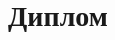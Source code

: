 \documentclass[14pt,a4paper,russian]{extreport}
\begin{document}
\title{Диплом}

\maketitle

\tableofcontents %
	\PrintTextInfo
	



\end{document}
